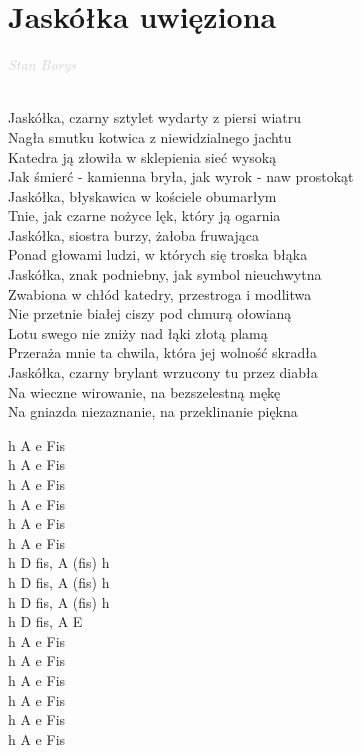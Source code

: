 \documentclass[a5paper, 10pt]{book}
\begin{document}
\section{Jaskółka uwięziona}\textcolor{lightgray}{\textit{Stan Borys}}\\~\\
\begin{minipage}[t]{0.8\textwidth}
Jaskółka, czarny sztylet wydarty z piersi wiatru\\
Nagła smutku kotwica z niewidzialnego jachtu\\
Katedra ją złowiła w sklepienia sieć wysoką\\
Jak śmierć - kamienna bryła, jak wyrok - naw prostokąt\\
Jaskółka, błyskawica w kościele obumarłym\\
Tnie, jak czarne nożyce lęk, który ją ogarnia\\

\hspace*{5mm}Jaskółka, siostra burzy, żałoba fruwająca\\
\hspace*{5mm}Ponad głowami ludzi, w których się troska błąka\\
\hspace*{5mm}Jaskółka, znak podniebny, jak symbol nieuchwytna\\
\hspace*{5mm}Zwabiona w chłód katedry, przestroga i modlitwa\\

Nie przetnie białej ciszy pod chmurą ołowianą\\
Lotu swego nie zniży nad łąki złotą plamą\\
Przeraża mnie ta chwila, która jej wolność skradła\\
Jaskółka, czarny brylant wrzucony tu przez diabła\\

Na wieczne wirowanie, na bezszelestną mękę\\
Na gniazda niezaznanie, na przeklinanie piękna\\
\end{minipage}
\begin{minipage}[t]{0.2\textwidth}
h A e Fis\\h A e Fis\\h A e Fis\\h A e Fis\\h A e Fis\\h A e Fis\\

h D fis, A (fis) h\\
h D fis, A (fis) h\\
h D fis, A (fis) h\\
h D fis, A E\\

h A e Fis\\h A e Fis\\h A e Fis\\h A e Fis\\

h A e Fis\\h A e Fis\\
\end{minipage}
\end{document}
